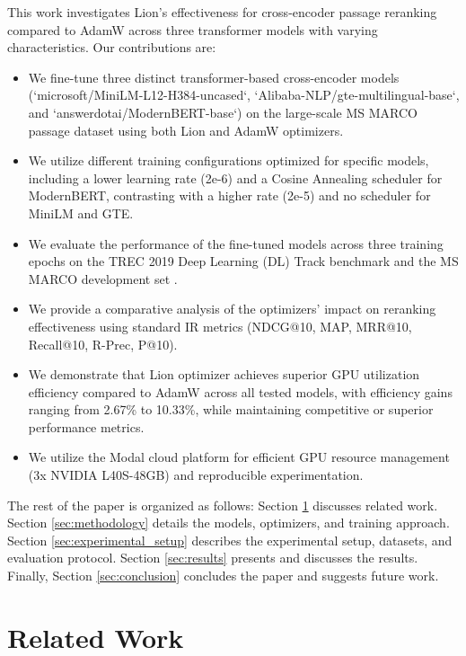 \documentclass[conference]{IEEEtran}
\begin{document}
This work investigates Lion's effectiveness for cross-encoder passage reranking compared to AdamW across three transformer models with varying characteristics. Our contributions are:
\begin{itemize}
    \item We fine-tune three distinct transformer-based cross-encoder models (`microsoft/MiniLM-L12-H384-uncased`, `Alibaba-NLP/gte-multilingual-base`, and `answerdotai/ModernBERT-base`) on the large-scale MS MARCO passage dataset \cite{DBLP:journals/corr/NguyenRSGTMD16} using both Lion and AdamW optimizers.
    \item We utilize different training configurations optimized for specific models, including a lower learning rate (2e-6) and a Cosine Annealing scheduler for ModernBERT, contrasting with a higher rate (2e-5) and no scheduler for MiniLM and GTE.
    \item We evaluate the performance of the fine-tuned models across three training epochs on the TREC 2019 Deep Learning (DL) Track \cite{craswell2020overview} benchmark and the MS MARCO development set \cite{DBLP:journals/corr/NguyenRSGTMD16}.
    \item We provide a comparative analysis of the optimizers' impact on reranking effectiveness using standard IR metrics (NDCG@10, MAP, MRR@10, Recall@10, R-Prec, P@10).
    \item We demonstrate that Lion optimizer achieves superior GPU utilization efficiency compared to AdamW across all tested models, with efficiency gains ranging from 2.67\% to 10.33\%, while maintaining competitive or superior performance metrics.
    \item We utilize the Modal cloud platform \cite{modal_labs} for efficient GPU resource management (3x NVIDIA L40S-48GB) and reproducible experimentation.
\end{itemize}
The rest of the paper is organized as follows: Section \ref{sec:related_work} discusses related work. Section \ref{sec:methodology} details the models, optimizers, and training approach. Section \ref{sec:experimental_setup} describes the experimental setup, datasets, and evaluation protocol. Section \ref{sec:results} presents and discusses the results. Finally, Section \ref{sec:conclusion} concludes the paper and suggests future work.

\section{Related Work}
\label{sec:related_work}
\end{document}
